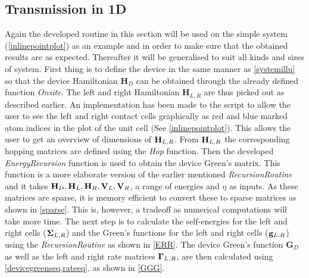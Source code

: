\subsection{Transmission in 1D}
Again the developed routine in this section will be used on the simple system (\cref{inlinepointplot}) as an example and in order to make sure that the obtained results are as expected. Thereafter it will be generalised to suit all kinds and sizes of system. First thing is to define the device in the same manner as \cref{systemillu} so that the device Hamiltonian \(\textbf{H}_D\) can be obtained through the already defined function \textit{Onsite}. The left and right Hamiltonian \(\textbf{H}_{L,R}\) are thus picked out as described earlier. An implementation has been made to the script to allow the user to see the left and right contact cells graphically as red and blue marked atom indices in the plot of the unit cell (See \cref{inlinepointplot}).
This allows the user to get an overview of dimensions of \(\vb{H}_{L,R}\). From \(\vb{H}_{L,R}\) the corresponding hopping matrices are defined using the \textit{Hop} function. Then the developed \textit{EnergyRecursion} function is used to obtain the device Green's matrix. This function is a more elaborate version of the earlier mentioned \textit{RecursionRoutine} and it takes \(\vb{H}_D,\vb{H}_L,\vb{H}_R,\vb{V}_L,\vb{V}_R\), a range of energies and \(\eta\) as inputs. As these matrices are sparse, it is memory efficient to convert these to sparse matrices as shown in \cref{sparse}. This is, however, a tradeoff as numerical computations will take more time.
\vspace{-.5\baselineskip}
\vspace{\baselineskip}
The next step is to calculate the self-energies for the left and right cells (\(\vb{\Sigma}_{L,R}\)) and the Green's functions for the left and right cells (\(\vb{g}_{L,R}\)) using the \textit{RecursionRoutine} as shown in \cref{ERR}.
\vspace{-.5\baselineskip}
\vspace{\baselineskip}
The device Green's function \(\textbf{G}_D\) as well as the left and right rate matrices \(\vb{\Gamma}_{L,R}\), are then calculated using \cref{devicegreenseq,rateeq}, as shown in \cref{GGG}.
